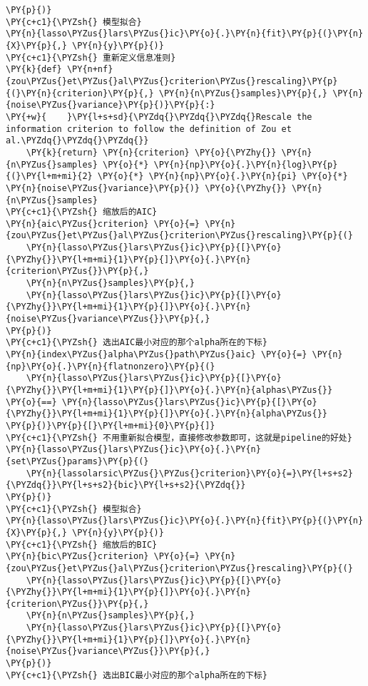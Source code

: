 \begin{Verbatim}[commandchars=\\\{\}]
\PY{p}{)}
\PY{c+c1}{\PYZsh{} 模型拟合}
\PY{n}{lasso\PYZus{}lars\PYZus{}ic}\PY{o}{.}\PY{n}{fit}\PY{p}{(}\PY{n}{X}\PY{p}{,} \PY{n}{y}\PY{p}{)}
\PY{c+c1}{\PYZsh{} 重新定义信息准则}
\PY{k}{def} \PY{n+nf}{zou\PYZus{}et\PYZus{}al\PYZus{}criterion\PYZus{}rescaling}\PY{p}{(}\PY{n}{criterion}\PY{p}{,} \PY{n}{n\PYZus{}samples}\PY{p}{,} \PY{n}{noise\PYZus{}variance}\PY{p}{)}\PY{p}{:}
\PY{+w}{    }\PY{l+s+sd}{\PYZdq{}\PYZdq{}\PYZdq{}Rescale the information criterion to follow the definition of Zou et al.\PYZdq{}\PYZdq{}\PYZdq{}}
    \PY{k}{return} \PY{n}{criterion} \PY{o}{\PYZhy{}} \PY{n}{n\PYZus{}samples} \PY{o}{*} \PY{n}{np}\PY{o}{.}\PY{n}{log}\PY{p}{(}\PY{l+m+mi}{2} \PY{o}{*} \PY{n}{np}\PY{o}{.}\PY{n}{pi} \PY{o}{*} \PY{n}{noise\PYZus{}variance}\PY{p}{)} \PY{o}{\PYZhy{}} \PY{n}{n\PYZus{}samples}
\PY{c+c1}{\PYZsh{} 缩放后的AIC}
\PY{n}{aic\PYZus{}criterion} \PY{o}{=} \PY{n}{zou\PYZus{}et\PYZus{}al\PYZus{}criterion\PYZus{}rescaling}\PY{p}{(}
    \PY{n}{lasso\PYZus{}lars\PYZus{}ic}\PY{p}{[}\PY{o}{\PYZhy{}}\PY{l+m+mi}{1}\PY{p}{]}\PY{o}{.}\PY{n}{criterion\PYZus{}}\PY{p}{,}
    \PY{n}{n\PYZus{}samples}\PY{p}{,}
    \PY{n}{lasso\PYZus{}lars\PYZus{}ic}\PY{p}{[}\PY{o}{\PYZhy{}}\PY{l+m+mi}{1}\PY{p}{]}\PY{o}{.}\PY{n}{noise\PYZus{}variance\PYZus{}}\PY{p}{,}
\PY{p}{)}
\PY{c+c1}{\PYZsh{} 选出AIC最小对应的那个alpha所在的下标}
\PY{n}{index\PYZus{}alpha\PYZus{}path\PYZus{}aic} \PY{o}{=} \PY{n}{np}\PY{o}{.}\PY{n}{flatnonzero}\PY{p}{(}
    \PY{n}{lasso\PYZus{}lars\PYZus{}ic}\PY{p}{[}\PY{o}{\PYZhy{}}\PY{l+m+mi}{1}\PY{p}{]}\PY{o}{.}\PY{n}{alphas\PYZus{}} \PY{o}{==} \PY{n}{lasso\PYZus{}lars\PYZus{}ic}\PY{p}{[}\PY{o}{\PYZhy{}}\PY{l+m+mi}{1}\PY{p}{]}\PY{o}{.}\PY{n}{alpha\PYZus{}}
\PY{p}{)}\PY{p}{[}\PY{l+m+mi}{0}\PY{p}{]}
\PY{c+c1}{\PYZsh{} 不用重新拟合模型，直接修改参数即可，这就是pipeline的好处}
\PY{n}{lasso\PYZus{}lars\PYZus{}ic}\PY{o}{.}\PY{n}{set\PYZus{}params}\PY{p}{(}
    \PY{n}{lassolarsic\PYZus{}\PYZus{}criterion}\PY{o}{=}\PY{l+s+s2}{\PYZdq{}}\PY{l+s+s2}{bic}\PY{l+s+s2}{\PYZdq{}}
\PY{p}{)}
\PY{c+c1}{\PYZsh{} 模型拟合}
\PY{n}{lasso\PYZus{}lars\PYZus{}ic}\PY{o}{.}\PY{n}{fit}\PY{p}{(}\PY{n}{X}\PY{p}{,} \PY{n}{y}\PY{p}{)}
\PY{c+c1}{\PYZsh{} 缩放后的BIC}
\PY{n}{bic\PYZus{}criterion} \PY{o}{=} \PY{n}{zou\PYZus{}et\PYZus{}al\PYZus{}criterion\PYZus{}rescaling}\PY{p}{(}
    \PY{n}{lasso\PYZus{}lars\PYZus{}ic}\PY{p}{[}\PY{o}{\PYZhy{}}\PY{l+m+mi}{1}\PY{p}{]}\PY{o}{.}\PY{n}{criterion\PYZus{}}\PY{p}{,}
    \PY{n}{n\PYZus{}samples}\PY{p}{,}
    \PY{n}{lasso\PYZus{}lars\PYZus{}ic}\PY{p}{[}\PY{o}{\PYZhy{}}\PY{l+m+mi}{1}\PY{p}{]}\PY{o}{.}\PY{n}{noise\PYZus{}variance\PYZus{}}\PY{p}{,}
\PY{p}{)}
\PY{c+c1}{\PYZsh{} 选出BIC最小对应的那个alpha所在的下标}

\end{Verbatim}
